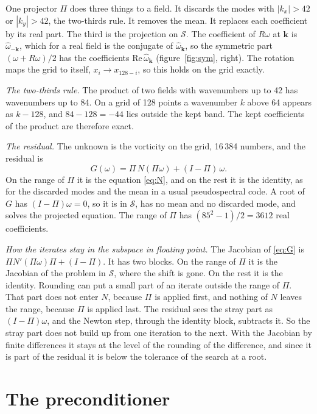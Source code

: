 \documentclass[11pt,a4paper]{article}
\newcommand{\om}{\omega}
\newcommand{\omh}{\hat\omega}
\begin{document}
One projector $\Pi$ does three things to a field. It discards the modes with $|k_x| > 42$ or $|k_y| > 42$, the two-thirds rule. It removes the mean. It replaces each coefficient by its real part. The third is the projection on $\mathcal S$. The coefficient of $R\om$ at $\mathbf k$ is $\omh_{-\mathbf k}$, which for a real field is the conjugate of $\omh_{\mathbf k}$, so the symmetric part $(\om + R\om)/2$ has the coefficients $\mathrm{Re}\,\omh_{\mathbf k}$ (figure~\ref{fig:sym}, right). The rotation maps the grid to itself, $x_i \to x_{128 - i}$, so this holds on the grid exactly.

\emph{The two-thirds rule.} The product of two fields with wavenumbers up to 42 has wavenumbers up to 84. On a grid of 128 points a wavenumber $k$ above 64 appears as $k - 128$, and $84 - 128 = -44$ lies outside the kept band. The kept coefficients of the product are therefore exact.

\emph{The residual.} The unknown is the vorticity on the grid, 16\,384 numbers, and the residual is
\begin{equation}
G(\om) = \Pi\,N(\Pi\om) + (I - \Pi)\,\om .
\label{eq:G}
\end{equation}
On the range of $\Pi$ it is the equation \eqref{eq:N}, and on the rest it is the identity, as for the discarded modes and the mean in a usual pseudospectral code. A root of $G$ has $(I - \Pi)\om = 0$, so it is in $\mathcal S$, has no mean and no discarded mode, and solves the projected equation. The range of $\Pi$ has $(85^2 - 1)/2 = 3612$ real coefficients.

\emph{How the iterates stay in the subspace in floating point.} The Jacobian of \eqref{eq:G} is $\Pi N'(\Pi\om)\Pi + (I - \Pi)$. It has two blocks. On the range of $\Pi$ it is the Jacobian of the problem in $\mathcal S$, where the shift is gone. On the rest it is the identity. Rounding can put a small part of an iterate outside the range of $\Pi$. That part does not enter $N$, because $\Pi$ is applied first, and nothing of $N$ leaves the range, because $\Pi$ is applied last. The residual sees the stray part as $(I - \Pi)\om$, and the Newton step, through the identity block, subtracts it. So the stray part does not build up from one iteration to the next. With the Jacobian by finite differences it stays at the level of the rounding of the difference, and since it is part of the residual it is below the tolerance of the search at a root.

\section{The preconditioner}
\end{document}
